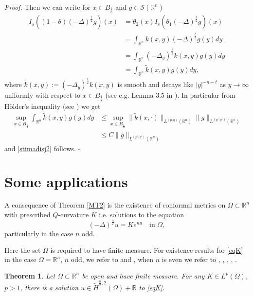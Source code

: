 \documentclass[11pt, a4paper]{article}
\newtheorem{trm}{Theorem}
\newcommand{\R}{\mathbb{R}}
\newenvironment{proof}{\noindent\emph{Proof.}}{\phantom{ } \hfill$\square$\medskip}
\begin{document}
\begin{proof}
Then we can write for $x\in B_\frac18$ and $g\in\mathcal{S}(\R^n)$
\[\begin{split}
I_s((1-\theta)(-\Delta)^\frac{t}{2} g)(x)& = \theta_2(x)I_s(\theta_1(-\Delta)^\frac{t}{2} g)(x)\\
&=\int_{\R^n} k(x,y) (-\Delta)^\frac{t}{2}g(y)dy\\
&= \int_{\R^n} (-\Delta_y)^\frac{t}{2}k(x,y) g(y)dy\\
&= \int_{\R^n} \tilde k(x,y) g(y)dy,
\end{split}
\]
where $\tilde k(x,y):=(-\Delta_y)^\frac{t}{2}k(x,y)$ is smooth and decays like $|y|^{-n-t}$ as $y\to\infty$ uniformly with respect to $x\in B_\frac18$ (see e.g. Lemma 3.5 in \cite{MMS}).
In particular from H\"older's inequality (see \cite[Theorem 3.4]{one}) we get
\[\begin{split}
\sup_{x\in B_\frac18} \int_{\R^n} \tilde k(x,y) g(y)dy&\le \sup_{x\in B_\frac18} \|\tilde k(x,\cdot)\|_{L^{(p,q)}(\R^n)} \|g\|_{L^{(p',q')}(\R^n)}\\
&\le C \|g\|_{L^{(p',q')}(\R^n)}
\end{split}\]
and \eqref{stimadisj2} follows.
\end{proof}


\section{Some applications}\label{sec:3}

A consequence of Theorem \ref{MT2} is the existence of conformal metrics on $\Omega\subset\R^n$ with prescribed $Q$-curvature $K$ i.e. solutions to  
the equation
\begin{equation}\label{eqK}
(-\Delta)^\frac{n}{2} u=Ke^{nu}\quad \text{in }\Omega,
\end{equation}
particularly in the case $n$ odd.

Here the set $\Omega$ is required to have finite measure. For existence results for \eqref{eqK} in the case $\Omega=\R^n$, $n$ odd, we refer to \cite{hyd} and \cite{JMMX}, when $n$ is even we refer to \cite{CC}, \cite{CK}, \cite{H-M}, \cite{mar0}, \cite{W-Y}.

\begin{trm}\label{trmexK} Let $\Omega\subset\R^n$ be open and have finite measure. For any  $K\in L^p(\Omega)$, $p>1$, there is a solution $u\in \tilde H^{\frac n2,2}(\Omega)+\R$ to \eqref{eqK}.
\end{trm}
\end{document}
